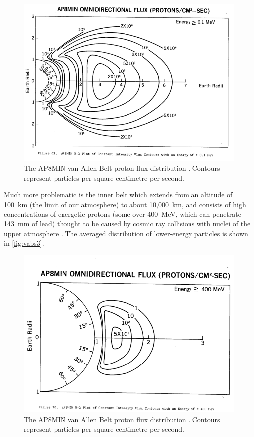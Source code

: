 \begin{figure} 
\includegraphics[width=\textwidth,clip,trim=0 35 0 30]{Images/800px-Ap8-omni-0_100MeV.png}
\caption{The AP8MIN van Allen Belt proton flux distribution \parencite{Sawyer1976}. Contours represent particles per square centimetre per second.} \label{fig:vabs2}
\end{figure}

Much more problematic is the inner belt which extends from an altitude of 100~km (the limit of our atmosphere) to about 10,000~km, and consists of high concentrations of energetic protons (some over 400~MeV, which can penetrate 143~mm of lead) thought to be caused by cosmic ray collisions with nuclei of the upper atmosphere \parencite{Hess1968}. The averaged distribution of lower-energy particles is shown in \autoref{fig:vabs3}.

\begin{figure} 
\includegraphics[width=\textwidth,clip,trim=0 35 0 67]{Images/800px-Ap8-omni-400_0MeV.png}
\caption{The AP8MIN van Allen Belt proton flux distribution \parencite{Sawyer1976}. Contours represent particles per square centimetre per second.} \label{fig:vabs3}
\end{figure}

